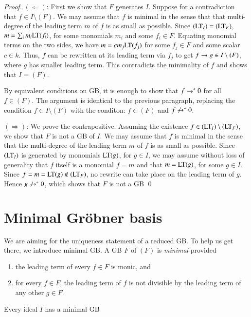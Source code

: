 \documentclass{llncs}
\begin{document}
\begin{proof}
$(\Leftarrow)$:  First we show that $F$ generates $I$.  Suppose
for a contradiction that  $f\in I\setminus (F)$.  We may assume that $f$
is minimal in the sense that that multi-degree of the leading term $m$ of $f$ is as
small as possible.  Since $({\hbox{LT}}_I) = ({\hbox{LT}}_F)$,
$m = \sum_i m_i {\hbox{LT}}(f_i)$, for some monomials $m_i$ and some $f_i\in F$.
Equating monomial terms on the two sides, we have $m = c m_j {\hbox{LT}}(f_j)$ for some
$f_j\in F$ and some scalar $c\in k$.  Thus, $f$ can be rewritten at its leading term via $f_j$ to get 
$f\rightarrow g\in I\setminus (F)$, where $g$ has smaller leading term.  This contradicts
the minimality of $f$ and shows that $I=(F)$.

By equivalent conditions on GB, it is enough to show that $f\rightarrow^* 0 $
for all $f\in (F)$.  The argument is identical to the previous paragraph, replacing
the condition $f\in I\setminus (F)$ with the conditon: $f\in (F)$ and $f\not\ras 0$.

$(\Rightarrow)$:  We prove the contrapositive.  Assuming the existence 
$f\in ({\hbox{LT}}_I)\setminus ({\hbox{LT}}_F)$, we
show that $F$ is not a GB of $I$.  We may assume that $f$ is minimal in
the sense that the multi-degree of the leading term $m$ of $f$ is as small
as possible.   Since $({\hbox{LT}}_I)$ is generated by monomials ${\hbox{LT}}(g)$, for $g\in I$,
we may assume without loss of generality that $f$ itself is a monomial $f=m$ and
that $m = {\hbox{LT}}(g)$, for some $g \in I$.  Since $f=m={\hbox{LT}}(g)\not\in ({\hbox{LT}}_F)$, no rewrite
can take place on the leading term of $g$.  Hence $g\not\ras 0$, which shows that
$F$ is not a GB
\qed
\end{proof}

\section{Minimal Gr\"obner basis}

We are aiming for the uniqueness statement of a reduced GB.  To help us get there, we introduce minimal GB.
A GB $F$ of $(F)$ is {\it minimal} provided
\begin{enumerate}
\item the leading term of every $f\in F$ is monic, and
\item for every $f\in F$, the leading term of $f$ is not divisible by the leading term 
of any other $g\in F$.
\end{enumerate}

\begin{lemma} Every ideal $I$ has a minimal GB
\end{lemma}
\end{document}
